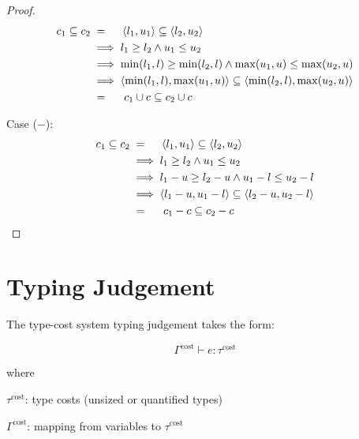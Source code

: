 \begin{proof}
  \begin{align*}
    c_1 \subseteq c_2 & \; = \hspace{4.5mm} \langle{l_1, u_1}\rangle \subseteq \langle{l_2, u_2}\rangle                          \\
                      & \implies l_1 \geq l_2 \land u_1 \leq u_2                                                 \\
                      & \implies \min(l_1, l) \geq \min(l_2, l) \land \max(u_1, u) \leq \max(u_2, u)             \\
                      & \implies \langle{\min(l_1, l), \max(u_1, u)}\rangle \subseteq \langle{\min(l_2, l), \max(u_2, u)}\rangle \\
                      & \; = \hspace{5mm} c_1 \cup c \subseteq c_2 \cup c
  \end{align*}

  Case (\(-\)):
  \begin{align*}
    c_1 \subseteq c_2 & \; = \hspace{4.5mm} \langle{l_1, u_1}\rangle \subseteq \langle{l_2, u_2}\rangle      \\
                      & \implies l_1 \geq l_2 \land u_1 \leq u_2                             \\
                      & \implies l_1 - u \geq l_2 - u \land u_1 - l \leq u_2 - l             \\
                      & \implies \langle{l_1 - u, u_1 - l}\rangle \subseteq \langle{l_2 - u, u_2 - l}\rangle \\
                      & \; = \hspace{5mm} c_1 - c \subseteq c_2 - c
  \end{align*}
\end{proof}


\section*{Typing Judgement}

The type-cost system typing judgement takes the form:

\[ \Gamma^\textrm{cost} \vdash e : \tau^\textrm{cost} \]

where

\vspace{3mm}

\( \tau^\textrm{cost} \): type costs (unsized or quantified types)

\( \Gamma^\textrm{cost} \): mapping from variables to \( \tau^\textrm{cost} \)

